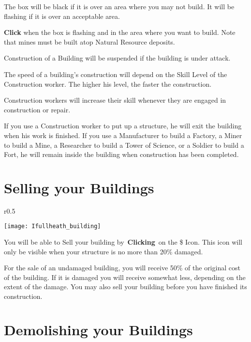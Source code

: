 The box will be black if it is over an area where you may not build. It will be flashing if it is over an acceptable area.

\textbf{Click} when the box is flashing and in the area where you want to build. Note that mines must be built atop Natural Resource deposits. 


Construction of a Building will be suspended if the building is under attack.

The speed of a building’s construction will depend on the Skill Level of the Construction worker. The higher his level, the faster the construction.

Construction workers will increase their skill whenever they are engaged in construction or repair.

If you use a Construction worker to put up a structure, he will exit the building when his work is finished. If you use a Manufacturer to build a Factory, a Miner to build a Mine, a Researcher to build a Tower of Science, or a Soldier to build a Fort, he will remain inside the building when construction has been completed.

\section{Selling your Buildings}


\begin{wrapfigure}{r}{0.5\textwidth}
	\vspace{-20pt}
	\begin{center}
		\texttt{[image: Ifullheath\_building]}
	\end{center}
	\vspace{-20pt}
\end{wrapfigure}

You will be able to Sell your building by \textbf{Clicking} on the \$ Icon. This icon will only be visible when your structure is no more than 20\% damaged.

For the sale of an undamaged building, you will receive 50\% of the original cost of the building. If it is damaged you will receive somewhat less, depending on the extent of the damage. You may also sell your building before you have finished its construction.

\section{Demolishing your Buildings}

